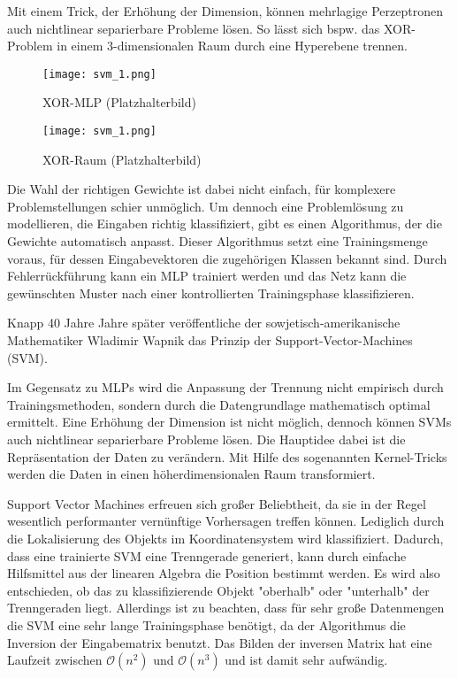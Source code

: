 Mit einem Trick, der Erhöhung der Dimension, können mehrlagige Perzeptronen auch nichtlinear separierbare Probleme lösen. 
So lässt sich bspw. das XOR-Problem in einem 3-dimensionalen Raum durch eine Hyperebene trennen.

\begin{figure}[h]
	\begin{center}
		 \texttt{[image: svm\_1.png]}
	\end{center}
	\caption{XOR-MLP (Platzhalterbild)}
	\label{fig:svm1}
\end{figure}

\begin{figure}[hb]
	\begin{center}
		 \texttt{[image: svm\_1.png]}
	\end{center}
	\caption{XOR-Raum (Platzhalterbild)}
	\label{fig:svm1}
\end{figure}

Die Wahl der richtigen Gewichte ist dabei nicht einfach, für komplexere Problemstellungen schier unmöglich. 
Um dennoch eine Problemlösung zu modellieren, die Eingaben richtig klassifiziert, gibt es einen Algorithmus, der die Gewichte automatisch anpasst.
Dieser Algorithmus setzt eine Trainingsmenge voraus, für dessen Eingabevektoren die zugehörigen Klassen bekannt sind. 
Durch Fehlerrückführung kann ein MLP trainiert werden und das Netz kann die gewünschten Muster nach einer kontrollierten Trainingsphase klassifizieren.

Knapp 40 Jahre Jahre später veröffentliche der sowjetisch-amerikanische Mathematiker Wladimir Wapnik \cite{Vapnik} das Prinzip der Support-Vector-Machines (SVM).

Im Gegensatz zu MLPs wird die Anpassung der Trennung nicht empirisch durch Trainingsmethoden, sondern durch die Datengrundlage mathematisch optimal ermittelt. 
Eine Erhöhung der Dimension ist nicht möglich, dennoch können SVMs auch nichtlinear separierbare Probleme lösen. 
Die Hauptidee dabei ist die Repräsentation der Daten zu verändern. 
Mit Hilfe des sogenannten Kernel-Tricks werden die Daten in einen höherdimensionalen Raum transformiert. 

Support Vector Machines erfreuen sich großer Beliebtheit, da sie in der Regel wesentlich performanter vernünftige Vorhersagen treffen können. Lediglich durch die Lokalisierung des Objekts im Koordinatensystem wird klassifiziert. Dadurch, dass eine trainierte SVM eine Trenngerade generiert, kann durch einfache Hilfsmittel aus der linearen Algebra die Position bestimmt werden. Es wird also entschieden, ob das zu klassifizierende Objekt "{}oberhalb"{} oder "{}unterhalb"{} der Trenngeraden liegt. Allerdings ist zu beachten, dass für sehr große Datenmengen die SVM eine sehr lange Trainingsphase benötigt, da der Algorithmus die Inversion der Eingabematrix benutzt. Das Bilden der inversen Matrix hat eine Laufzeit zwischen $\mathcal O(n^2)$ und $\mathcal O(n^3)$ und ist damit sehr aufwändig.


